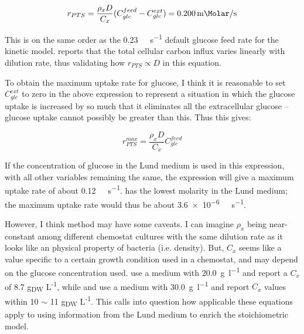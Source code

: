 \documentclass[a4paper]{scrartcl}
\begin{document}
  \[
    r_{PTS} = \frac{\rho_{x}D}{C_{x}}(C_{glc}^{feed} - C_{glc}^{ext}) = \SI{0.200}{\milli\Molar\per\second}
  \]

  This is on the same order as the \SI{0.23}{\milli\Molar\per\second} default glucose feed rate for the kinetic model.  \citet{nanchen_nonlinear_2006} reports that the total cellular carbon influx varies linearly with dilution rate, thus validating how $r_{PTS} \propto D$ in this equation.

  To obtain the maximum uptake rate for glucose, I think it is reasonable to set $C_{glc}^{ext}$ to zero in the above expression to represent a situation in which the glucose uptake is increased by so much that it eliminates all the extracellular glucose -- glucose uptake cannot possibly be greater than this.  Thus this gives:

  \[
    r_{PTS}^{max} = \frac{\rho_{x}D}{C_{x}}C_{glc}^{feed}
  \]

  If the concentration of glucose in the Lund medium is used in this expression, with all other variables remaining the same, the expression will give a maximum uptake rate of about \SI{0.12}{\milli\Molar\per\second}.   has the lowest molarity in the Lund medium; the maximum  uptake rate would thus be about \SI{3.6e-6}{\milli\Molar\per\second}.

  However, I think method may have some caveats.  I can imagine $\rho_{x}$ being near-constant among different chemostat cultures with the same dilution rate as it looks like an physical property of bacteria (i.e. density).  But, $C_{x}$ seems like a value specific to a certain growth condition used in a chemostat, and may depend on the glucose concentration used.  \citet{chassagnole_dynamic_2002} use a medium with \SI{20.0}{\gram\per\litre} and report a $C_{x}$ of 8.7 g\textsubscript{DW} L\textsuperscript{-1}, while \citet{taymaz-nikerel_development_2009} and \cite{taymaz-nikerel_escherichia_2011} use a medium with \SI{30.0}{\gram\per\litre} and report $C_{x}$ values within 10 $\sim$ 11 g\textsubscript{DW} L\textsuperscript{-1}.  This calls into question how applicable these equations apply to using information from the Lund medium to enrich the stoichiometric model.

\printbibliography
\end{document}
